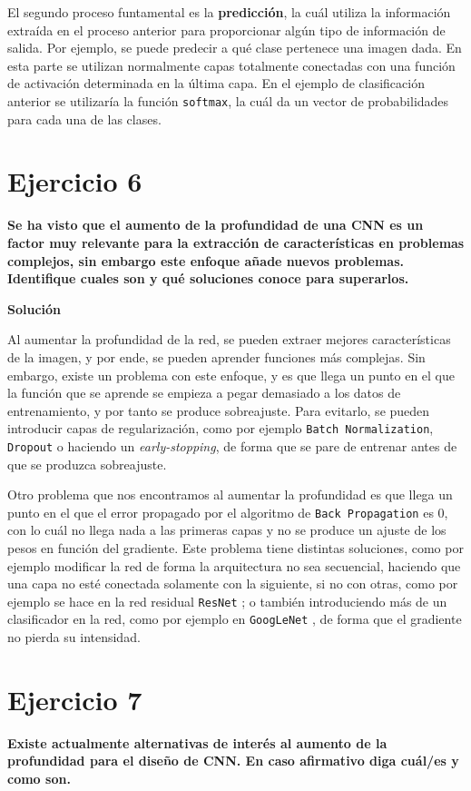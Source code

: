 \documentclass[11pt,a4paper]{article}
\newcommand{\answer}{\noindent\textbf{Solución}}
\newcommand{\question}[1]{\noindent\textbf{#1}}
\newcommand{\nonumsection}[1]{\section*{#1}\addcontentsline{toc}{section}{#1}}
\begin{document}
El segundo proceso funtamental es la \textbf{predicción}, la cuál utiliza
la información extraída en el proceso anterior para proporcionar algún tipo
de información de salida. Por ejemplo, se puede predecir a qué clase pertenece una
imagen dada. En esta parte se utilizan normalmente capas totalmente
conectadas con una función de activación determinada en la última capa. En el
ejemplo de clasificación anterior se utilizaría la función \texttt{softmax},
la cuál da un vector de probabilidades para cada una de las clases.

\nonumsection{Ejercicio 6}

\question{Se ha visto que el aumento de la profundidad de una CNN es un
factor muy relevante para la extracción de características en
problemas complejos, sin embargo este enfoque añade nuevos problemas.
Identifique cuales son y qué soluciones conoce para superarlos.}

\answer

Al aumentar la profundidad de la red, se pueden extraer mejores características
de la imagen, y por ende, se pueden aprender funciones más complejas. Sin
embargo, existe un problema con este enfoque, y es que llega un punto en el
que la función que se aprende se empieza a pegar demasiado a los datos
de entrenamiento, y por tanto se produce sobreajuste. Para evitarlo, se pueden
introducir capas de regularización, como por ejemplo \texttt{Batch Normalization},
\texttt{Dropout} o haciendo un \textit{early-stopping}, de forma que
se pare de entrenar antes de que se produzca sobreajuste.

Otro problema que nos encontramos al aumentar la profundidad es que llega un
punto en el que el error propagado por el algoritmo de \texttt{Back Propagation}
es 0, con lo cuál no llega nada a las primeras capas y no se produce un ajuste
de los pesos en función del gradiente. Este problema tiene distintas soluciones,
como por ejemplo modificar la red de forma
la arquitectura no sea secuencial, haciendo que una capa no esté conectada
solamente con la siguiente, si no con otras, como por ejemplo se hace
en la red residual \texttt{ResNet} \cite{DBLP:journals/corr/HeZRS15};
o también introduciendo más de un clasificador en la red, como por ejemplo
en \texttt{GoogLeNet} \cite{DBLP:journals/corr/SzegedyLJSRAEVR14},
de forma que el gradiente no pierda su intensidad.


\nonumsection{Ejercicio 7}

\question{Existe actualmente alternativas de interés al aumento de la
profundidad para el diseño de CNN. En caso afirmativo diga cuál/es y
como son.}
\end{document}
